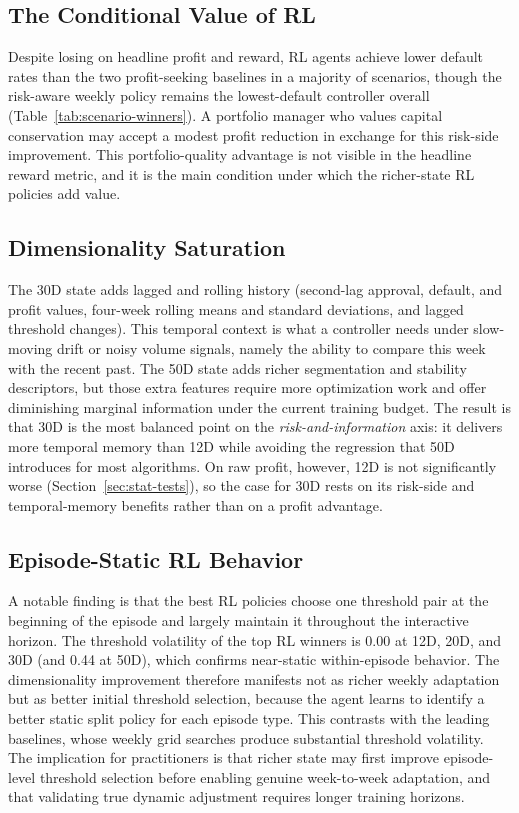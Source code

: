 \documentclass[preprint,review,authoryear,12pt]{elsarticle}
\begin{document}
\subsection{The Conditional Value of RL}

Despite losing on headline profit and reward, RL agents achieve lower default rates than
the two profit-seeking baselines in a majority of scenarios, though the risk-aware weekly
policy remains the lowest-default controller overall
(Table~\ref{tab:scenario-winners}). A portfolio manager who values capital conservation
may accept a modest profit reduction in exchange for this risk-side improvement. This
portfolio-quality advantage is not visible in the headline reward metric, and it is the
main condition under which the richer-state RL policies add value.

\subsection{Dimensionality Saturation}

The 30D state adds lagged and rolling history (second-lag approval, default, and profit
values, four-week rolling means and standard deviations, and lagged threshold changes).
This temporal context is what a controller needs under slow-moving drift or noisy volume
signals, namely the ability to compare this week with the recent past. The 50D state adds
richer segmentation and stability descriptors, but those extra features require more
optimization work and offer diminishing marginal information under the current training
budget. The result is that 30D is the most balanced point on the
\emph{risk-and-information} axis: it delivers more temporal memory than 12D while
avoiding the regression that 50D introduces for most algorithms. On raw profit, however,
12D is not significantly worse (Section~\ref{sec:stat-tests}), so the case for 30D rests
on its risk-side and temporal-memory benefits rather than on a profit advantage.

\subsection{Episode-Static RL Behavior}
\label{sec:episode-static}

A notable finding is that the best RL policies choose one threshold pair at the beginning
of the episode and largely maintain it throughout the interactive horizon. The threshold
volatility of the top RL winners is 0.00 at 12D, 20D, and 30D (and 0.44 at 50D), which
confirms near-static within-episode behavior. The dimensionality improvement therefore
manifests not as richer weekly adaptation but as better initial threshold selection,
because the agent learns to identify a better static split policy for each episode type.
This contrasts with the leading baselines, whose weekly grid searches produce substantial
threshold volatility. The implication for practitioners is that richer state may first
improve episode-level threshold selection before enabling genuine week-to-week
adaptation, and that validating true dynamic adjustment requires longer training
horizons.
\end{document}
